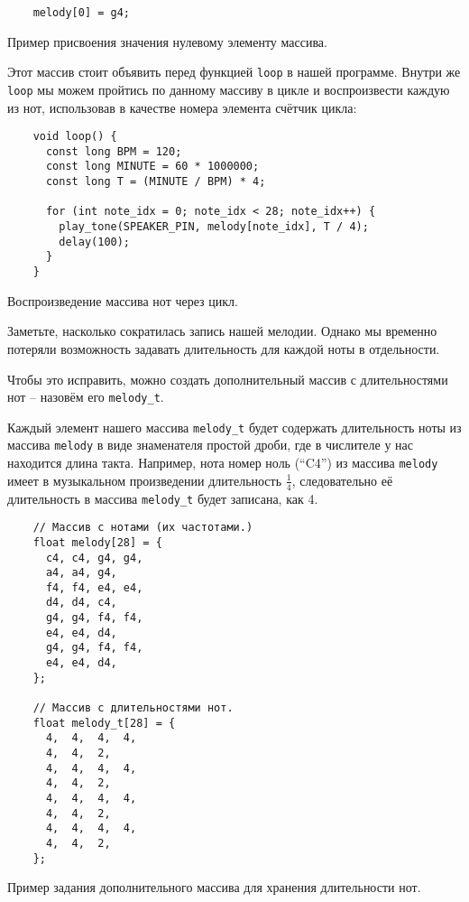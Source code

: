 \documentclass[../sparc.tex]{subfiles}
\begin{document}
\begin{listing}[ht]
  \begin{verbatim}
    melody[0] = g4;
  \end{verbatim}
  \label{listing:music-array-example-2}
  \caption{Пример присвоения значения нулевому элементу массива.}
\end{listing}

Этот массив стоит объявить перед функцией \texttt{loop} в нашей программе.
Внутри же \texttt{loop} мы можем пройтись по данному массиву в цикле и
воспроизвести каждую из нот, использовав в качестве номера элемента счётчик
цикла:

\begin{listing}[ht]
  \begin{verbatim}
    void loop() {
      const long BPM = 120;
      const long MINUTE = 60 * 1000000;
      const long T = (MINUTE / BPM) * 4;

      for (int note_idx = 0; note_idx < 28; note_idx++) {
        play_tone(SPEAKER_PIN, melody[note_idx], T / 4);
        delay(100);
      }
    }
  \end{verbatim}
  \label{listing:music-array-example-3}
  \caption{Воспроизведение массива нот через цикл.}
\end{listing}

Заметьте, насколько сократилась запись нашей мелодии. Однако мы временно
потеряли возможность задавать длительность для каждой ноты в отдельности.

Чтобы это исправить, можно создать дополнительный массив с длительностями нот --
назовём его \texttt{melody\_t}.

Каждый элемент нашего массива \texttt{melody\_t} будет содержать длительность
ноты из массива \texttt{melody} в виде знаменателя простой дроби, где в
числителе у нас находится длина такта. Например, нота номер ноль (``C4'') из
массива \texttt{melody} имеет в музыкальном произведении длительность
$\frac{1}{4}$, следовательно её длительность в массива \texttt{melody\_t} будет
записана, как 4.

\begin{listing}[ht]
  \begin{verbatim}
    // Массив с нотами (их частотами.)
    float melody[28] = {
      c4, c4, g4, g4,
      a4, a4, g4,
      f4, f4, e4, e4,
      d4, d4, c4,
      g4, g4, f4, f4,
      e4, e4, d4,
      g4, g4, f4, f4,
      e4, e4, d4,
    };

    // Массив с длительностями нот.
    float melody_t[28] = {
      4,  4,  4,  4,
      4,  4,  2,
      4,  4,  4,  4,
      4,  4,  2,
      4,  4,  4,  4,
      4,  4,  2,
      4,  4,  4,  4,
      4,  4,  2,
    };
  \end{verbatim}
  \label{listing:music-array-example-4}
  \caption{Пример задания дополнительного массива для хранения длительности
    нот.}
\end{listing}
\end{document}
